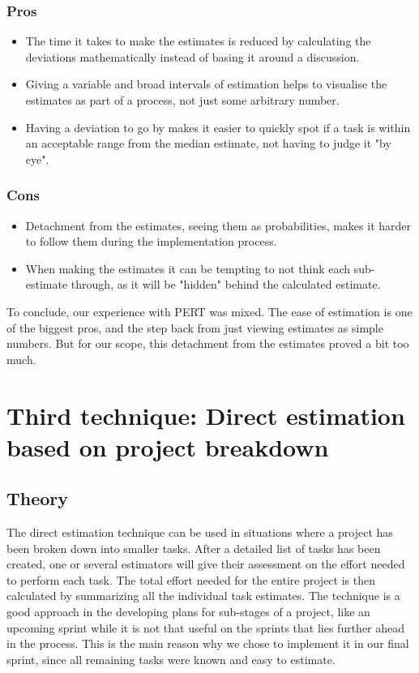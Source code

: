 \subsubsection{Pros}
\begin{itemize}
\item The time it takes to make the estimates is reduced by calculating the deviations mathematically instead of basing it around a discussion. 
\item Giving a variable and broad intervals of estimation helps to visualise the estimates as part of a process, not just some arbitrary number.
\item Having a deviation to go by makes it easier to quickly spot if a task is within an acceptable range from the median estimate, not having to judge it "by eye".

\end{itemize}

\subsubsection{Cons}
\begin{itemize}
\item Detachment from the estimates, seeing them as probabilities, makes it harder to follow them during the implementation process.
\item When making the estimates it can be tempting to not think each sub-estimate through, as it will be "hidden" behind the calculated estimate.

\end{itemize}

To conclude, our experience with PERT was mixed. The ease of estimation is one of the biggest pros, and the step back from just viewing estimates as simple numbers. But for our scope, this detachment from the estimates proved a bit too much.

\section{Third technique: Direct estimation based on project breakdown}
\subsection{Theory}
The direct estimation technique can be used in situations where a project has been broken down into smaller tasks. After a detailed list of tasks has been created, one or several estimators will give their assessment on the effort needed to perform each task. The total effort needed for the entire project is then calculated by summarizing all the individual task estimates.
The technique is a good approach in the developing plans for sub-stages of a project, like an upcoming sprint while it is not that useful on the sprints that lies further ahead in the process. This is the main reason why we chose to implement it in our final sprint, since all remaining tasks were known and easy to estimate.


